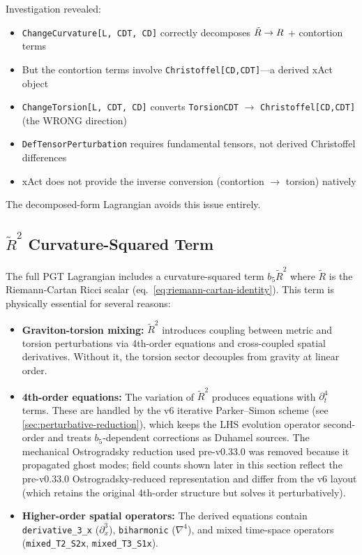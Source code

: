 Investigation revealed:
\begin{itemize}
  \item \texttt{ChangeCurvature[L, CDT, CD]} correctly decomposes $\tilde{R} \to R$ + contortion terms
  \item But the contortion terms involve \texttt{Christoffel[CD,CDT]}---a derived xAct object
  \item \texttt{ChangeTorsion[L, CDT, CD]} converts \texttt{TorsionCDT} $\to$ \texttt{Christoffel[CD,CDT]} (the WRONG direction)
  \item \texttt{DefTensorPerturbation} requires fundamental tensors, not derived Christoffel differences
  \item xAct does not provide the inverse conversion (contortion $\to$ torsion) natively
\end{itemize}

The decomposed-form Lagrangian avoids this issue entirely.

\subsection{$\tilde{R}^2$ Curvature-Squared Term}
\label{sec:rtilde-squared}

The full PGT Lagrangian includes a curvature-squared term $b_5 \tilde{R}^2$ where $\tilde{R}$ is the Riemann-Cartan Ricci scalar (eq.~\ref{eq:riemann-cartan-identity}). This term is physically essential for several reasons:

\begin{itemize}
  \item \textbf{Graviton-torsion mixing:} $\tilde{R}^2$ introduces coupling between metric and torsion perturbations via 4th-order equations and cross-coupled spatial derivatives. Without it, the torsion sector decouples from gravity at linear order.
  \item \textbf{4th-order equations:} The variation of $\tilde{R}^2$ produces equations with $\partial_t^4$ terms.  These are handled by the v6 iterative Parker--Simon scheme (see \cref{sec:perturbative-reduction}), which keeps the LHS evolution operator second-order and treats $b_5$-dependent corrections as Duhamel sources. The mechanical Ostrogradsky reduction used pre-v0.33.0 was removed because it propagated ghost modes; field counts shown later in this section reflect the pre-v0.33.0 Ostrogradsky-reduced representation and differ from the v6 layout (which retains the original 4th-order structure but solves it perturbatively).
  \item \textbf{Higher-order spatial operators:} The derived equations contain \texttt{derivative\_3\_x} ($\partial_x^3$), \texttt{biharmonic} ($\nabla^4$), and mixed time-space operators (\texttt{mixed\_T2\_S2x}, \texttt{mixed\_T3\_S1x}).
\end{itemize}

